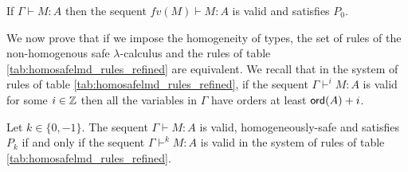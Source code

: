 \begin{lem}
\label{lem:context_reduction} If $\Gamma \vdash M : A$ then the sequent $fv(M) \vdash M : A$ is valid and satisfies $P_0$.
\end{lem}


We now prove that if we impose the homogeneity of types, the set of rules of the non-homogenous safe $\lambda$-calculus
and the rules of table \ref{tab:homosafelmd_rules_refined} are equivalent.  We recall that in the system of rules of
table \ref{tab:homosafelmd_rules_refined}, if the sequent $\Gamma \vdash^{i} M : A$ is valid for some $i \in
\mathbb{Z}$ then all the variables in $\Gamma$ have orders at least ${\sf ord}(A)+i$.

\begin{prop}
\label{prop:nonhomogsafe_homog_restriction}
Let $k \in \{ 0, -1 \}$. The sequent $\Gamma \vdash M : A$ is valid, homogeneously-safe and satisfies $P_k$
if and only if the sequent $\Gamma \vdash^k M : A$ is valid in the system of rules of table \ref{tab:homosafelmd_rules_refined}.
\end{prop}


